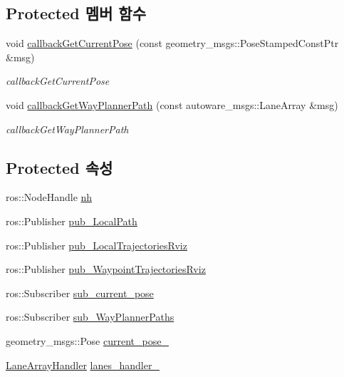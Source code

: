 \subsection*{Protected 멤버 함수}
\begin{DoxyCompactItemize}
\item 
void \hyperlink{class_c_keti_local_planning_a144131de19f37584bab4412f98e1fc63}{callback\+Get\+Current\+Pose} (const geometry\+\_\+msgs\+::\+Pose\+Stamped\+Const\+Ptr \&msg)
\begin{DoxyCompactList}\small\item\em callback\+Get\+Current\+Pose \end{DoxyCompactList}\item 
void \hyperlink{class_c_keti_local_planning_ab385a1021d3d90f9f2b7b5a40dd791c2}{callback\+Get\+Way\+Planner\+Path} (const autoware\+\_\+msgs\+::\+Lane\+Array \&msg)
\begin{DoxyCompactList}\small\item\em callback\+Get\+Way\+Planner\+Path \end{DoxyCompactList}\end{DoxyCompactItemize}
\subsection*{Protected 속성}
\begin{DoxyCompactItemize}
\item 
ros\+::\+Node\+Handle \hyperlink{class_c_keti_local_planning_a39a260e89fa7805f6c0c7112c91cb847}{nh}
\item 
ros\+::\+Publisher \hyperlink{class_c_keti_local_planning_a42f394ae6069296e6f412eb5daa9dd3a}{pub\+\_\+\+Local\+Path}
\item 
ros\+::\+Publisher \hyperlink{class_c_keti_local_planning_a423ed1137dde91f12793bdcacb4e0bea}{pub\+\_\+\+Local\+Trajectories\+Rviz}
\item 
ros\+::\+Publisher \hyperlink{class_c_keti_local_planning_a54aec2f11f157100a74b09a9cf5fa38b}{pub\+\_\+\+Waypoint\+Trajectories\+Rviz}
\item 
ros\+::\+Subscriber \hyperlink{class_c_keti_local_planning_ac399c600a59f7b79448ba1f1bbfda8ca}{sub\+\_\+current\+\_\+pose}
\item 
ros\+::\+Subscriber \hyperlink{class_c_keti_local_planning_a75e59488889af86a89995f2c606677ce}{sub\+\_\+\+Way\+Planner\+Paths}
\item 
geometry\+\_\+msgs\+::\+Pose \hyperlink{class_c_keti_local_planning_a4f4dcb94c250fb4d324b33f2fa42ffcb}{current\+\_\+pose\+\_\+}
\item 
\hyperlink{class_lane_array_handler}{Lane\+Array\+Handler} \hyperlink{class_c_keti_local_planning_a6295120665288244397783d747cc60cf}{lanes\+\_\+handler\+\_\+}
\end{DoxyCompactItemize}


